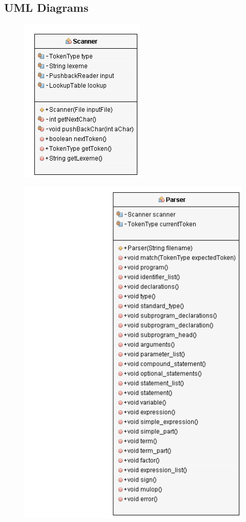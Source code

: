 \documentclass[10]{amsart}
\begin{document}
\begin{appendices}
\section{UML Diagrams}
\label{uml}
\begin{figure}
	\includegraphics{ScannerUML.png}
\end{figure}
\begin{figure}
	\includegraphics{ParserUML.png}

\end{figure}
\end{appendices}
\end{document}
